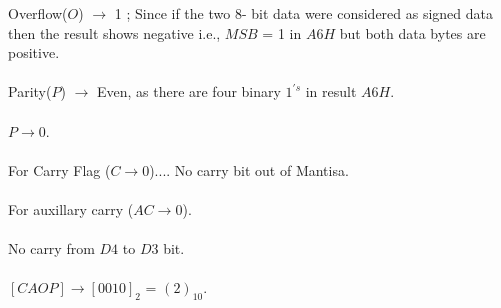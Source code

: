 \documentclass{article}
\begin{document}
\begin{enumerate}
Overflow($O$) $\rightarrow$ 1 ; Since if the two 8- bit data were considered as signed data then the result shows negative i.e., $MSB$ = 1 in $A6H$ but both data bytes are positive.\\
\\
Parity($P$) $\rightarrow$ Even, as there are four binary $1^{'s}$ in result $A6H$.\\
\\
$P \rightarrow 0$.\\
\\
For Carry Flag ($C \rightarrow 0$).... No carry bit out of Mantisa.\\
\\
For auxillary carry ($AC \rightarrow 0$).\\
\\
No carry from $D4$ to $D3$ bit.\\
\\
$[CAOP] \rightarrow [0010]_{2}$ = $(2)_{10}$.\\
\\
\end{enumerate}
\end{document}
